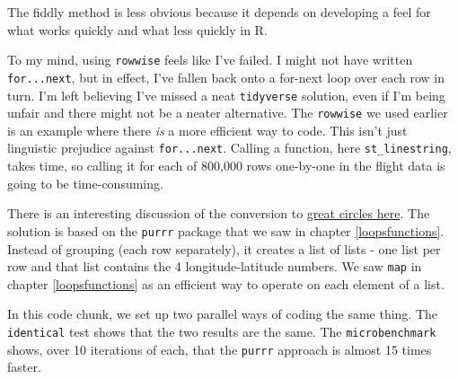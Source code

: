 \documentclass[
]{book}
\begin{document}
The fiddly method is less obvious because it depends on developing a feel for what works quickly and what less quickly in R.

To my mind, using \texttt{rowwise} feels like I've failed. I might not have written \texttt{for...next}, but in effect, I've fallen back onto a for-next loop over each row in turn. I'm left believing I've missed a neat \texttt{tidyverse} solution, even if I'm being unfair and there might not be a neater alternative. The \texttt{rowwise} we used earlier is an example where there \emph{is} a more efficient way to code. This isn't just linguistic prejudice against \texttt{for...next}. Calling a function, here \texttt{st\_linestring}, takes time, so calling it for each of 800,000 rows one-by-one in the flight data is going to be time-consuming.

There is an interesting discussion of the conversion to \href{https://www.findingyourway.io/blog/2018/02/28/2018-02-28_great-circles-with-sf-and-leaflet/}{great circles here}. The solution is based on the \texttt{purrr} package that we saw in chapter \ref{loopsfunctions}. Instead of grouping (each row separately), it creates a list of lists - one list per row and that list contains the 4 longitude-latitude numbers. We saw \texttt{map} in chapter \ref{loopsfunctions} as an efficient way to operate on each element of a list.

In this code chunk, we set up two parallel ways of coding the same thing. The \texttt{identical} test shows that the two results are the same. The \texttt{microbenchmark} shows, over 10 iterations of each, that the \texttt{purrr} approach is almost 15 times faster.
\end{document}
